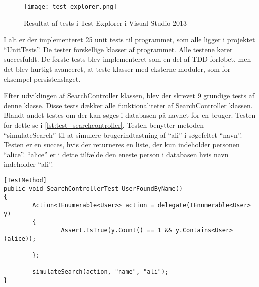 \begin{figure}
  \centering
  \texttt{[image: test\_explorer.png]}
  \caption{Resultat af tests i Test Explorer i Visual Studio 2013}
  \label{fig:test_explorer}
\end{figure}

I alt er der implementeret 25 unit tests til programmet, som alle ligger i projektet \enquote{UnitTests}. De tester forskellige klasser af programmet. Alle testene kører succesfuldt. De første tests blev implementeret som en del af TDD forløbet, men det blev hurtigt avanceret, at teste klasser med eksterne moduler, som for eksempel persistenslaget. 

Efter udviklingen af SearchController klassen, blev der skrevet 9 grundige tests af denne klasse. Disse tests dækker alle funktionaliteter af SearchController klassen. Blandt andet testes om der kan søges i databasen på navnet for en bruger. Testen for dette se i \cref{lst:test_searchcontroller}. Testen benytter metoden \enquote{simulateSearch} til at simulere brugerindtastning af \enquote{ali} i søgefeltet \enquote{navn}. Testen er en succes, hvis der returneres en liste, der kun indeholder personen \enquote{alice}. \enquote{alice} er i dette tilfælde den eneste person i databasen hvis navn indeholder \enquote{ali}.

\begin{lstlisting}[label=lst:test_searchcontroller, caption={Eksempel på testfunktion}]
[TestMethod]
public void SearchControllerTest_UserFoundByName()
{
        Action<IEnumerable<User>> action = delegate(IEnumerable<User> y)
        {
                Assert.IsTrue(y.Count() == 1 && y.Contains<User>(alice));

        };

        simulateSearch(action, "name", "ali");
}
\end{lstlisting}